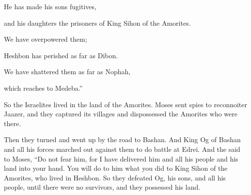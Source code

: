 {\par }{\Q He has made
his sons
fugitives,
\par }{\Q and his daughters
the prisoners
of King
Sihon
of the Amorites.
\par }{\Q {}We have overpowered
them;

\par }{\Q Heshbon
has perished
as far as
Dibon.
\par }{\Q We have shattered
them as far as
Nophah,
\par }{\Q which
reaches to Medeba.”
\par }{\PP {}So the Israelites
lived
in the land
of the Amorites.
Moses
sent
spies
to reconnoiter Jaazer,
and they captured
its villages
and dispossessed
the Amorites
who
were there.
\par }{\PP {}Then they turned
and went up
by the road
to Bashan.
And King
Og
of Bashan
and all
his forces
marched out against them to do battle
at Edrei.
And the
{}
said
to
Moses,
“Do not
fear
him, for
I have delivered
him
and all
his people
and his land
into your hand. You will
do
to him what
you
did
to King
Sihon
of the Amorites,
who
lived
in Heshbon.
So they defeated
Og, his sons,
and all
his people,
until
there were
no survivors,
and they possessed
his land.


}
